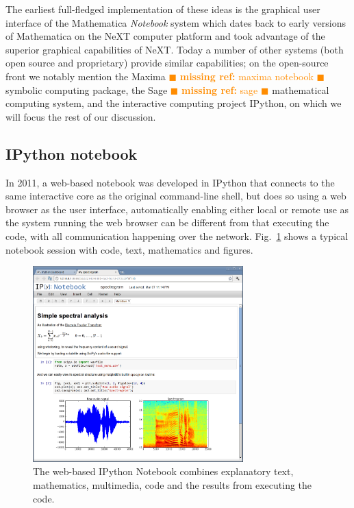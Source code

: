 \documentclass[ChapterTOCs,krantz2]{krantz} %
\theoremstyle{definition}
\newcommand{\mref}[1] { \textcolor{darkorange} {
\ensuremath{\blacksquare} {\bf missing ref:}  {#1}
\ensuremath{\blacksquare} } }
\begin{document}
The earliest full-fledged implementation of these ideas is the graphical user
interface of the Mathematica \emph{Notebook} system which dates back to early
versions of Mathematica on the NeXT computer platform and took advantage of the
superior graphical capabilities of NeXT.  Today a number of other systems (both
open source and proprietary) provide similar capabilities; on the open-source
front we notably mention the Maxima \mref{maxima notebook} symbolic computing
package, the Sage \mref{sage} mathematical computing system, and the
interactive computing project IPython, on which we will focus the rest of our
discussion.

\subsection{IPython notebook}\label{IPython}


In 2011, a web-based notebook was developed in IPython that connects to the
same interactive core as the original command-line shell, but does so using a
web browser as the user interface, automatically enabling either local or
remote use as the system running the web browser can be different from that
executing the code, with all communication happening over the network.
Fig.~\ref{fig:IPython-notebook} shows a typical notebook session with code,
text, mathematics and figures.

\begin{figure}
  \begin{centering}
    \includegraphics[width=3.2in]{fig/ipython-notebook-specgram.png}\par
  \end{centering}

  \caption{\label{fig:IPython-notebook}The web-based IPython Notebook combines
    explanatory text, mathematics, multimedia, code and the results from
    executing the code.}
\end{figure}
\end{document}

